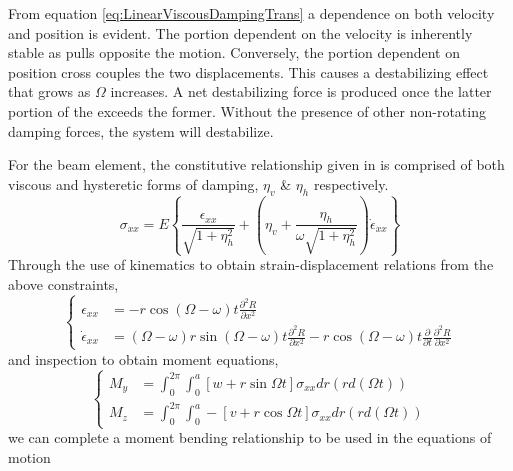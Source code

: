 From equation \eqref{eq:LinearViscousDampingTrans} a dependence on both velocity and position is evident. The portion dependent on the velocity is inherently stable as pulls opposite the motion. Conversely, the portion dependent on position cross couples the two displacements. This causes a destabilizing effect that grows as $ \Omega $ increases. A net destabilizing force is produced once the latter portion of the exceeds the former. Without the presence of other non-rotating damping forces, the system will destabilize.\par
For the beam element, the constitutive relationship given in \cite{zorzi1977finite} is comprised of both viscous and hysteretic forms of damping, $ \eta_v $ \& $ \eta_h $ respectively.
\begin{equation}\label{eq:LinearViscousHystericConstitutiveRelation}
\sigma_{xx}=E\left\{\frac{\epsilon_{xx}}{\sqrt{1+\eta_h^2}}+\left(\eta_v+\frac{\eta_h}{\omega\sqrt{1+\eta_h^2}}\right)\dot{\epsilon}_{xx}\right\}
\end{equation}
Through the use of kinematics to obtain strain-displacement relations from the above constraints,
\begin{equation}\label{eq:straindisplacement}
\left\{\begin{array}{rl}
\epsilon_{xx}&=-r\cos{\left(\Omega-\omega \right)t}\frac{\partial^2 R}{\partial x^2}\\
\dot{\epsilon}_{xx}&=(\Omega-\omega)r\sin{(\Omega-\omega)t}\frac{\partial^2 R}{\partial x^2} - r\cos{(\Omega-\omega)t}\frac{\partial}{\partial t}\frac{\partial^2 R}{\partial x^2}
\end{array}\right.
\end{equation}
and inspection to obtain moment equations,
\begin{equation}\label{eq:momentequations}
\left\{\begin{array}{rl}
M_y &= \int_0^{2\pi}\int_0^a[w+r\sin{\Omega t}]\sigma_{xx}dr(rd(\Omega t))\\
M_z &= \int_0^{2\pi}\int_0^a-[v+r\cos{\Omega t}]\sigma_{xx}dr(rd(\Omega t))
\end{array}\right.
\end{equation}
we can complete a moment bending relationship to be used in the equations of motion
